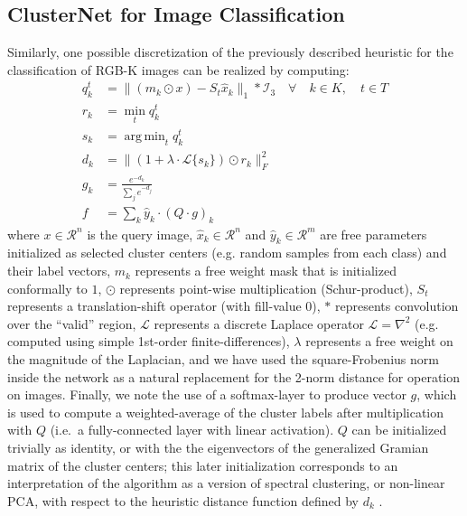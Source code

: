 \documentclass{article}
\DeclareMathOperator*{\argmin}{arg\,min}
\begin{document}
\subsection*{ClusterNet for Image Classification}
Similarly, one possible discretization of the previously described heuristic for the classification of RGB-K images can be realized by computing:
\begin{align*}
    q_k^t &= \|(m_k \odot x) - S_t \hat{x}_k\|_1 * \mathcal{I}_3 \quad \forall \quad k \in K,\quad t\in T \\
    r_k &= \min_t q_k^t \\
    s_k &= \argmin_t q_k^t \\
    d_k &= \|(1 + \lambda \cdot \mathcal{L}\{s_k\}) \odot r_k \|_F^2 \\
    g_k &= \frac{e^{-d_k}}{\sum_j e^{-d_j}} \\
    f &= \sum_k \hat{y}_k \cdot (Q \cdot g)_k %
\end{align*}
where $x \in \mathcal{R}^n$ is the query image, $\hat{x}_k \in \mathcal{R}^n$ and $\hat{y}_k \in \mathcal{R}^m$ are free parameters initialized as selected cluster centers (e.g. random samples from each class) and their label vectors, $m_k$ represents a free weight mask that is initialized conformally to $1$, $\odot$ represents point-wise multiplication (Schur-product), $S_t$ represents a translation-shift operator (with fill-value 0), $*$ represents convolution over the ``valid'' region, $\mathcal{L}$ represents a discrete Laplace operator $\mathcal{L} = \nabla^2$ (e.g. computed using simple 1st-order finite-differences), $\lambda$ represents a free weight on the magnitude of the Laplacian, and we have used the square-Frobenius norm inside the network as a natural replacement for the 2-norm distance for operation on images. Finally, we note the use of a softmax-layer to produce vector $g$, which is used to compute a weighted-average of the cluster labels after multiplication with $Q$ (i.e.~a fully-connected layer with linear activation). $Q$ can be initialized trivially as identity, or with the the eigenvectors of the generalized Gramian matrix of the cluster centers; this later initialization corresponds to an interpretation of the algorithm as a version of spectral clustering, or non-linear PCA, with respect to the heuristic distance function defined by $d_k$ \cite{baldi1989neural,hyvarinen2000independent,cho2009kernel}. 
\end{document}
